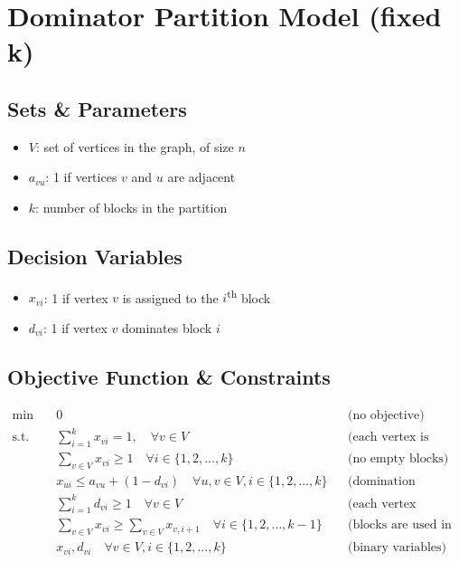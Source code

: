 \section{Dominator Partition Model (fixed k)}
\label{sec:dominator_partition_fixed_k}


\subsection*{Sets \& Parameters}
\begin{itemize}[label=, noitemsep]
    \item $V$: set of vertices in the graph, of size $n$
    \item $a_{vu}$: 1 if vertices $v$ and $u$ are adjacent
    \item $k$: number of blocks in the partition
\end{itemize}

\subsection*{Decision Variables}
\begin{itemize}[label=, noitemsep]
    \item $x_{vi}$: 1 if vertex $v$ is assigned to the $i$\textsuperscript{th} block
    \item $d_{vi}$: 1 if vertex $v$ dominates block $i$
\end{itemize}

\subsection*{Objective Function \& Constraints}
\begin{align*}
    \min \quad &0 &&\text{(no objective)}\\
    \text{s.t.} \quad
    &\sum_{i=1}^{k} x_{vi} = 1, \quad \forall v \in V &&\text{(each vertex is assigned to one block)}\\
    &\sum_{v \in V} x_{vi} \geq 1 \quad \forall i \in \{1, 2, \dots, k\} &&\text{(no empty blocks)}\\
    &x_{ui} \leq a_{vu} + (1 - d_{vi}) \quad \forall u,v \in V, i \in \{1, 2, \dots, k\} &&\text{(domination condition)}\\
    &\sum_{i=1}^{k} d_{vi} \geq 1 \quad \forall v \in V &&\text{(each vertex dominates at least one block)}\\
    & \sum_{v \in V} x_{vi} \geq \sum_{v \in V} x_{v,i+1} \quad \forall i \in \{1, 2, \dots, k-1\} &&\text{(blocks are used in order)}\\
    &x_{vi}, d_{vi} \quad \forall v \in V, i \in \{1, 2, \dots, k\} &&\text{(binary variables)}\\
\end{align*}
